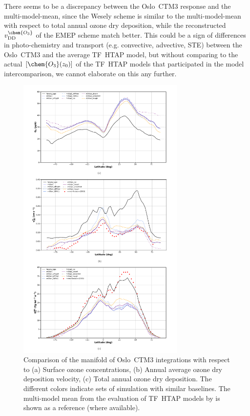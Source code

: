 \documentclass[gmd, manuscript]{copernicus}
\begin{document}
There seems to be a discrepancy between the Oslo~CTM3 response and the multi-model-mean, since the Wesely scheme is similar to the multi-model-mean with respect to total annual ozone dry deposition, while the reconstructed $v_\text{DD}^\chem{O_3}$ of the EMEP scheme match better. This could be a sign of differences in photo-chemistry and transport (e.g. convective, advective, STE) between the Oslo~CTM3 and the average TF~HTAP model, but without comparing to the actual $[\chem{O_3}(z_0)]$ of the TF~HTAP models that participated in the model intercomparison, we cannot elaborate on this any further. 

\begin{figure}[t]
  \includegraphics[width=8.3cm]{fig05}
  \caption{Comparison of the manifold of Oslo~CTM3 integrations with respect to (a) Surface ozone concentrations, (b) Annual average ozone dry deposition velocity, (c) Total annual ozone dry deposition. The different colors indicate sets of simulation with similar baselines. The multi-model mean from the evaluation of TF~HTAP models by \citet{ACP:Hardacre2015} is shown as a reference (where available).}
  \label{fig:mmm_drydep}
\end{figure}
%
\end{document}
